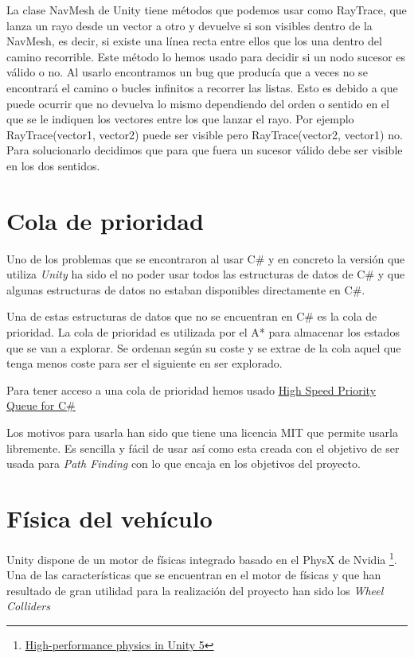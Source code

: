 La clase NavMesh de Unity tiene métodos que podemos usar como RayTrace, que lanza un rayo desde un vector a otro y devuelve si son visibles dentro de la NavMesh, es decir, si existe una línea recta entre ellos que los una dentro del camino recorrible. Este método lo hemos usado para decidir si un nodo sucesor es válido o no. Al usarlo encontramos un bug que producía que a veces no se encontrará el camino o bucles infinitos a recorrer las listas. Esto es debido a que puede ocurrir que no devuelva lo mismo dependiendo del orden o sentido en el que se le indiquen los vectores entre los que lanzar el rayo. Por ejemplo RayTrace(vector1, vector2) puede ser visible pero RayTrace(vector2, vector1) no. Para solucionarlo decidimos que para que fuera un sucesor válido debe ser visible en los dos sentidos.

\section{Cola de prioridad}
Uno de los problemas que se encontraron al usar C\# y en concreto la versión que utiliza \textit{Unity} ha sido el no poder usar todos las estructuras de datos de C\# y que algunas estructuras de datos no estaban disponibles directamente en C\#.

Una de estas estructuras de datos que no se encuentran en C\# es la cola de prioridad. La cola de prioridad es utilizada por el A* para almacenar los estados que se van a explorar. Se ordenan según su coste y se extrae de la cola aquel que tenga menos coste para ser el siguiente en ser explorado.

Para tener acceso a una cola de prioridad hemos usado
\href{https://github.com/BlueRaja/High-Speed-Priority-Queue-for-C-Sharp}{High Speed Priority Queue for C\# \cite{bluerajacola}}

Los motivos para usarla han sido que tiene una licencia MIT que permite usarla libremente. Es sencilla y fácil de usar así como esta creada con el objetivo de ser usada para \textit{Path Finding} con lo que encaja en los objetivos del proyecto.

\section{Física del vehículo}
Unity dispone de un motor de físicas integrado basado en el PhysX de Nvidia \footnote{\href{https://blogs.unity3d.com/es/2014/07/08/high-performance-physics-in-unity-5/}{High-performance physics in Unity 5}}. Una de las características que se encuentran en el motor de físicas y que han resultado de gran utilidad para la realización del proyecto han sido los \textit{Wheel Colliders}

